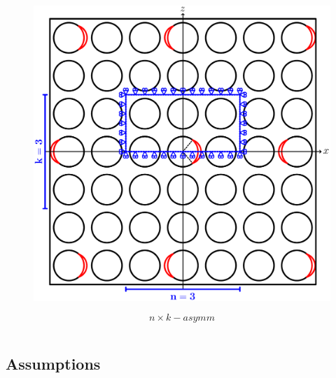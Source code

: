 \documentclass[first,firstsupp,lastsupp,last,hyperref,table]{ETHclass}
\begin{document}
\begin{frame}
\begin{columns}[c]
\begin{column}{0.5\textwidth}
\begin{figure}
\centering
\includegraphics[width=\columnwidth]{asymm.pdf}
\end{figure}
\vspace{-0.25cm}
\begin{equation*}
n\times k-asymm
\end{equation*}
\end{column}
\end{columns}
\end{frame}

\subsection{Assumptions}
\end{document}
